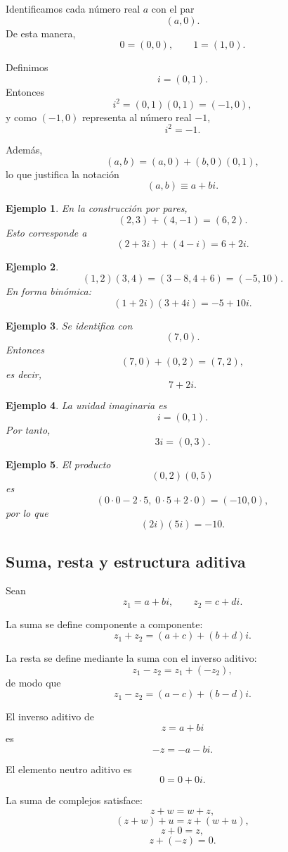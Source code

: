 \documentclass[12pt]{article}
\newtheorem{Ejem}{Ejemplo}
\begin{document}
Identificamos cada número real $a$ con el par
\[
(a,0).
\]
De esta manera,
\[
0=(0,0),
\qquad
1=(1,0).
\]

Definimos
\[
i=(0,1).
\]
Entonces
\[
i^2
=
(0,1)(0,1)
=
(-1,0),
\]
y como $(-1,0)$ representa al número real $-1$,
\[
\boxed{i^2=-1.}
\]

Además,
\[
(a,b)
=
(a,0)+(b,0)(0,1),
\]
lo que justifica la notación
\[
(a,b)\equiv a+bi.
\]


\begin{Ejem}En la construcción por pares,
\[
(2,3)+(4,-1)
=
(6,2).
\]
Esto corresponde a
\[
(2+3i)+(4-i)=6+2i.
\]
\end{Ejem}

\begin{Ejem}\[
(1,2)(3,4)
=
(3-8,4+6)
=
(-5,10).
\]
En forma binómica:
\[
(1+2i)(3+4i)=-5+10i.
\]
\end{Ejem}

\begin{Ejem}Se identifica con
\[
(7,0).
\]
Entonces
\[
(7,0)+(0,2)=(7,2),
\]
es decir,
\[
7+2i.
\]
\end{Ejem}

\begin{Ejem} La unidad imaginaria es
\[
i=(0,1).
\]
Por tanto,
\[
3i=(0,3).
\]
\end{Ejem}

\begin{Ejem} El producto
\[
(0,2)(0,5)
\]
es
\[
(0\cdot0-2\cdot5,\;0\cdot5+2\cdot0)
=
(-10,0),
\]
por lo que
\[
(2i)(5i)=-10.
\]
\end{Ejem}

\subsection*{Suma, resta y estructura aditiva}

Sean
\[
z_1=a+bi,
\qquad
z_2=c+di.
\]

La suma se define componente a componente:
\[
\boxed{
z_1+z_2
=
(a+c)+(b+d)i.
}
\]

La resta se define mediante la suma con el inverso aditivo:
\[
z_1-z_2
=
z_1+(-z_2),
\]
de modo que
\[
\boxed{
z_1-z_2
=
(a-c)+(b-d)i.
}
\]

El inverso aditivo de
\[
z=a+bi
\]
es
\[
\boxed{-z=-a-bi.}
\]

El elemento neutro aditivo es
\[
0=0+0i.
\]

La suma de complejos satisface:
\[
z+w=w+z,
\]
\[
(z+w)+u=z+(w+u),
\]
\[
z+0=z,
\]
\[
z+(-z)=0.
\]
\end{document}
